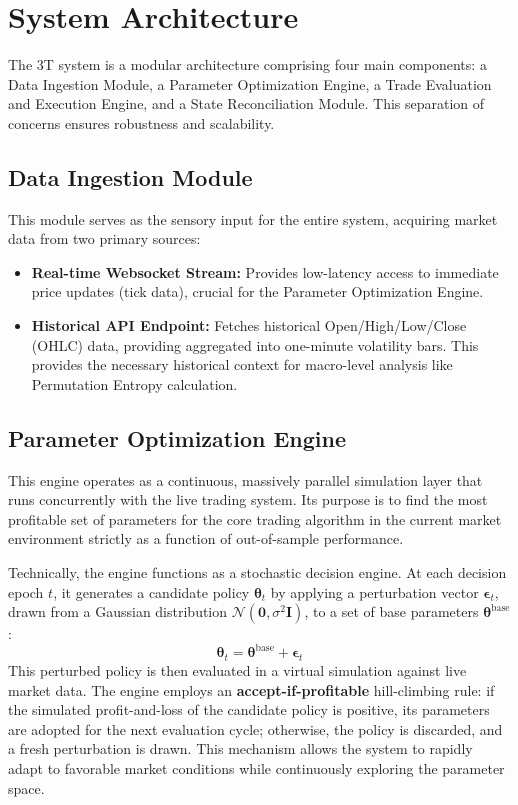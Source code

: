 \documentclass[10pt]{article}
\begin{document}
\section{System Architecture}
The 3T system is a modular architecture comprising four main components: a Data Ingestion Module, a Parameter Optimization Engine, a Trade Evaluation and Execution Engine, and a State Reconciliation Module. This separation of concerns ensures robustness and scalability.

\subsection{Data Ingestion Module}
This module serves as the sensory input for the entire system, acquiring market data from two primary sources:
\begin{itemize}
    \item \textbf{Real-time Websocket Stream:} Provides low-latency access to immediate price updates (tick data), crucial for the Parameter Optimization Engine.
    \item \textbf{Historical API Endpoint:} Fetches historical Open/High/Low/Close (OHLC) data, providing aggregated into one-minute volatility bars. This provides the necessary historical context for macro-level analysis like Permutation Entropy calculation.
\end{itemize}

\subsection{Parameter Optimization Engine}
This engine operates as a continuous, massively parallel simulation layer that runs concurrently with the live trading system. Its purpose is to find the most profitable set of parameters for the core trading algorithm in the current market environment strictly as a function of out-of-sample performance.

Technically, the engine functions as a stochastic decision engine. At each decision epoch $t$, it generates a candidate policy $\boldsymbol{\theta}_t$ by applying a perturbation vector $\boldsymbol{\epsilon}_t$, drawn from a Gaussian distribution $\mathcal{N}(\mathbf{0},\sigma^2\mathbf{I})$, to a set of base parameters $\boldsymbol{\theta}^{\text{base}}$:
$$\boldsymbol{\theta}_t = \boldsymbol{\theta}^{\text{base}} + \boldsymbol{\epsilon}_t$$
This perturbed policy is then evaluated in a virtual simulation against live market data. The engine employs an \textbf{accept-if-profitable} hill-climbing rule: if the simulated profit-and-loss of the candidate policy is positive, its parameters are adopted for the next evaluation cycle; otherwise, the policy is discarded, and a fresh perturbation is drawn. This mechanism allows the system to rapidly adapt to favorable market conditions while continuously exploring the parameter space.
\end{document}
